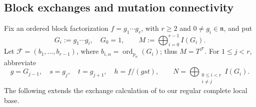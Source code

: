 \documentclass[a4paper,reqno]{amsart}
\def\F{\mathcal{F}}
\def\n{\mathfrak{n}}
\theoremstyle{definition}
\begin{document}
\subsection{Block exchanges and mutation connectivity}\label{sec:modifying-mutation}

Fix an ordered block factorization $f=g_1\cdots g_r$, with $r\ge2$ and $0\ne g_i\in\n$, and put
\[
G_i:=g_1\cdots g_i,\quad G_0=1,\qquad
M:=\bigoplus_{i=0}^{r-1}I(G_i).
\]
Let $\F=(b_1,\ldots,b_{r-1})$, where $b_{i,\alpha}=\operatorname{ord}_{p_\alpha}(G_i)$; thus $M=T^\F$. For $1\le j<r$, abbreviate
\[
g=G_{j-1},\quad s=g_j,\quad t=g_{j+1},\quad h=f/(gst),
\qquad N=\bigoplus_{\substack{0\le i<r\\i\ne j}}I(G_i).
\]
The following extends the exchange calculation of \cite[Lemmas 5.12--5.14]{IW18} to our regular complete local base.
\end{document}
